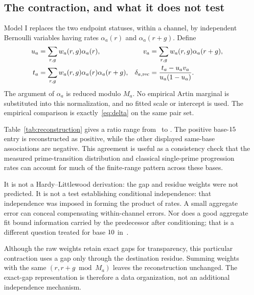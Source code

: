 \documentclass[11pt]{article}
\begin{document}
\subsection{The contraction, and what it does not test}
Model I replaces the two endpoint statuses, within a channel, by independent
Bernoulli variables having rates $\alpha_a(r)$ and $\alpha_a(r+g)$. Define
\begin{align*}
 u_a&=\sum_{r,g}w_a(r,g)\alpha_a(r),&
 v_a&=\sum_{r,g}w_a(r,g)\alpha_a(r+g),\\
 t_a&=\sum_{r,g}w_a(r,g)\alpha_a(r)\alpha_a(r+g),&
 \delta_{a,\mathrm{rec}}&=\frac{t_a-u_av_a}{u_a(1-u_a)}.
\end{align*}
The argument of $\alpha_a$ is reduced modulo $M_a$. No empirical Artin marginal
is substituted into this normalization, and no fitted scale or intercept is used.
The empirical comparison is exactly~\eqref{eq:delta} on the same pair set.

\begin{table}[htbp]\centering

\caption{Model I with empirical residue--gap weights. Ratio means
$\delta_{a,\mathrm{rec}}/\delta_{a,\mathrm{emp}}$, not predictive accuracy on a
held-out sample.}\label{tab:reconstruction}
\end{table}

Table~\ref{tab:reconstruction} gives a ratio range from \RatioMinimum\ to
\RatioMaximum. The positive base-$15$ entry is reconstructed as positive,
while the other displayed same-base associations are negative. This agreement
is useful as a consistency check that the measured prime-transition distribution
and classical single-prime progression rates can account for much of the
finite-range pattern across these bases.

It is not a Hardy--Littlewood derivation: the gap and residue weights were not
predicted. It is not a test establishing conditional independence: that
independence was imposed in forming the product of rates. A small aggregate
error can conceal compensating within-channel errors. Nor does a good aggregate
fit bound information carried by the predecessor after conditioning; that is a
different question treated for base $10$ in~\cite{baldconsolidated}.

Although the raw weights retain exact gaps for transparency, this particular
contraction uses a gap only through the destination residue. Summing weights
with the same $(r,r+g\bmod M_a)$ leaves the reconstruction unchanged. The
exact-gap representation is therefore a data organization, not an additional
independence mechanism.
\end{document}
